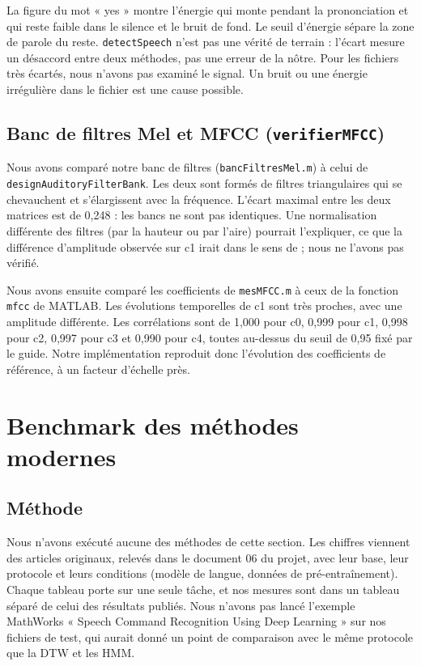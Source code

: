 La figure du mot « yes » montre l'énergie qui monte pendant la prononciation et qui reste faible dans le silence et le bruit de fond. Le seuil d'énergie sépare la zone de parole du reste. \texttt{detectSpeech} n'est pas une vérité de terrain : l'écart mesure un désaccord entre deux méthodes, pas une erreur de la nôtre. Pour les fichiers très écartés, nous n'avons pas examiné le signal. Un bruit ou une énergie irrégulière dans le fichier est une cause possible.

\subsection{Banc de filtres Mel et MFCC (\texttt{verifierMFCC})}

Nous avons comparé notre banc de filtres (\texttt{bancFiltresMel.m}) à celui de \texttt{designAuditoryFilterBank}. Les deux sont formés de filtres triangulaires qui se chevauchent et s'élargissent avec la fréquence. L'écart maximal entre les deux matrices est de 0,248 : les bancs ne sont pas identiques. Une normalisation différente des filtres (par la hauteur ou par l'aire) pourrait l'expliquer, ce que la différence d'amplitude observée sur c1 irait dans le sens de ; nous ne l'avons pas vérifié.

Nous avons ensuite comparé les coefficients de \texttt{mesMFCC.m} à ceux de la fonction \texttt{mfcc} de MATLAB. Les évolutions temporelles de c1 sont très proches, avec une amplitude différente. Les corrélations sont de 1,000 pour c0, 0,999 pour c1, 0,998 pour c2, 0,997 pour c3 et 0,990 pour c4, toutes au-dessus du seuil de 0,95 fixé par le guide. Notre implémentation reproduit donc l'évolution des coefficients de référence, à un facteur d'échelle près.

\section{Benchmark des méthodes modernes}

\subsection{Méthode}

Nous n'avons exécuté aucune des méthodes de cette section. Les chiffres viennent des articles originaux, relevés dans le document 06 du projet, avec leur base, leur protocole et leurs conditions (modèle de langue, données de pré-entraînement). Chaque tableau porte sur une seule tâche, et nos mesures sont dans un tableau séparé de celui des résultats publiés. Nous n'avons pas lancé l'exemple MathWorks « Speech Command Recognition Using Deep Learning » sur nos fichiers de test, qui aurait donné un point de comparaison avec le même protocole que la DTW et les HMM.


